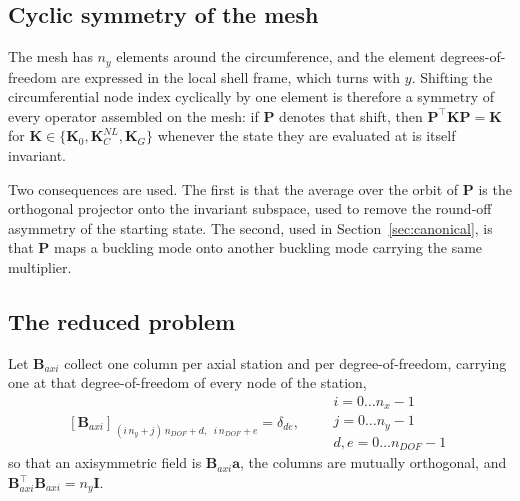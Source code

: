 \documentclass[11pt,a4paper]{article}
\begin{document}
\subsection{Cyclic symmetry of the mesh}

The mesh has $n_y$ elements around the circumference, and the element
degrees-of-freedom are expressed in the local shell frame, which turns with
$y$.  Shifting the circumferential node index cyclically by one element
is therefore a symmetry of every operator assembled on the mesh: if
$\boldsymbol{P}$ denotes that shift, then $\boldsymbol{P}^\top
\boldsymbol{K}\boldsymbol{P} = \boldsymbol{K}$ for
$\boldsymbol{K} \in \{\boldsymbol{K}_0, \boldsymbol{K}_C^{NL},
\boldsymbol{K}_G\}$ whenever the state they are evaluated at is itself
invariant.

Two consequences are used.  The first is that the average over the orbit of
$\boldsymbol{P}$ is the orthogonal projector onto the invariant subspace, used
to remove the round-off asymmetry of the starting state.  The second, used in
Section~\ref{sec:canonical}, is that $\boldsymbol{P}$ maps a buckling mode onto
another buckling mode carrying the same multiplier.

\subsection{The reduced problem}

Let $\boldsymbol{B}_{axi}$ collect one column per axial station and per
degree-of-freedom, carrying one at that degree-of-freedom of every node of
the station,
\begin{equation}\label{eq:baxi}
	\left[\boldsymbol{B}_{axi}\right]_{\,(i\,n_y + j)\,n_{DOF} + d,\;\;
	                                    i\,n_{DOF} + e} = \delta_{de},
	\qquad
	\begin{array}{l}
	i = 0\ldots n_x-1 \\ j = 0\ldots n_y-1 \\ d,e = 0\ldots n_{DOF}-1
	\end{array}
\end{equation}
so that an axisymmetric field is $\boldsymbol{B}_{axi}\boldsymbol{a}$, the
columns are mutually orthogonal, and $\boldsymbol{B}_{axi}^\top
\boldsymbol{B}_{axi} = n_y\boldsymbol{I}$.
\end{document}
